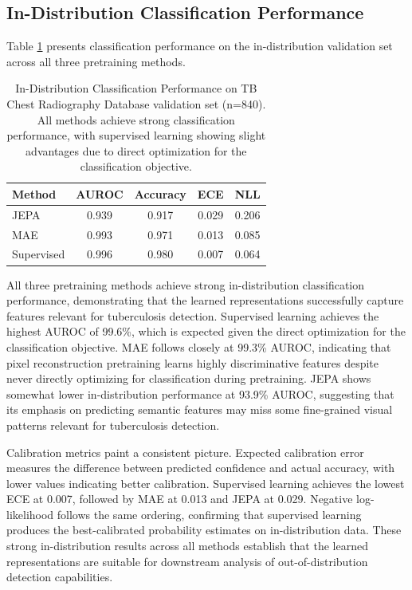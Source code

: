 \documentclass[11pt,a4paper]{article}
\begin{document}
\subsection{In-Distribution Classification Performance}

Table \ref{tab:id_classification} presents classification performance on the in-distribution validation set across all three pretraining methods.

\begin{table}[h]
\centering
\caption{In-Distribution Classification Performance on TB Chest Radiography Database validation set (n=840). All methods achieve strong classification performance, with supervised learning showing slight advantages due to direct optimization for the classification objective.}
\label{tab:id_classification}
\begin{tabular}{@{}lcccc@{}}
\toprule
Method & AUROC & Accuracy & ECE & NLL \\
\midrule
JEPA & 0.939 & 0.917 & 0.029 & 0.206 \\
MAE & 0.993 & 0.971 & 0.013 & 0.085 \\
Supervised & 0.996 & 0.980 & 0.007 & 0.064 \\
\bottomrule
\end{tabular}
\end{table}

All three pretraining methods achieve strong in-distribution classification performance, demonstrating that the learned representations successfully capture features relevant for tuberculosis detection. Supervised learning achieves the highest AUROC of 99.6\%, which is expected given the direct optimization for the classification objective. MAE follows closely at 99.3\% AUROC, indicating that pixel reconstruction pretraining learns highly discriminative features despite never directly optimizing for classification during pretraining. JEPA shows somewhat lower in-distribution performance at 93.9\% AUROC, suggesting that its emphasis on predicting semantic features may miss some fine-grained visual patterns relevant for tuberculosis detection.

Calibration metrics paint a consistent picture. Expected calibration error measures the difference between predicted confidence and actual accuracy, with lower values indicating better calibration. Supervised learning achieves the lowest ECE at 0.007, followed by MAE at 0.013 and JEPA at 0.029. Negative log-likelihood follows the same ordering, confirming that supervised learning produces the best-calibrated probability estimates on in-distribution data. These strong in-distribution results across all methods establish that the learned representations are suitable for downstream analysis of out-of-distribution detection capabilities.
\end{document}

